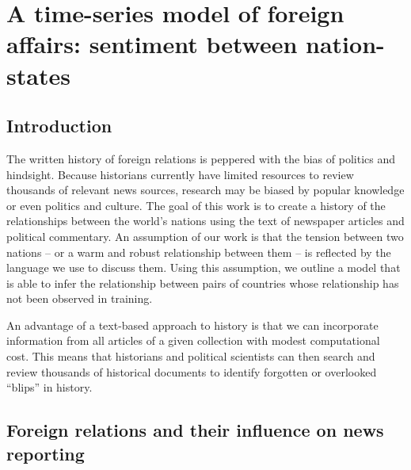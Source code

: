\chapter{A time-series model of foreign affairs: sentiment between nation-states}
\label{chapter:foreign_relations}

\section*{Introduction}
The written history of foreign relations is peppered with the bias of
politics and hindsight.  Because historians currently have limited
resources to review thousands of relevant news sources, research may
be biased by popular knowledge or even politics and culture. The goal
of this work is to create a history of the relationships between the
world's nations using the text of newspaper articles and political
commentary. An assumption of our work is that the tension between two
nations -- or a warm and robust relationship between them -- is
reflected by the language we use to discuss them. Using this
assumption, we outline a model that is able to infer the relationship
between pairs of countries whose relationship has not been observed in
training.


An advantage of a text-based approach to history is that we can
incorporate information from all articles of a given collection with
modest computational cost.  This means that historians and political
scientists can then search and review thousands of historical
documents to identify forgotten or overlooked ``blips'' in history.



\section{Foreign relations and their influence on news reporting}
\label{section:model}

